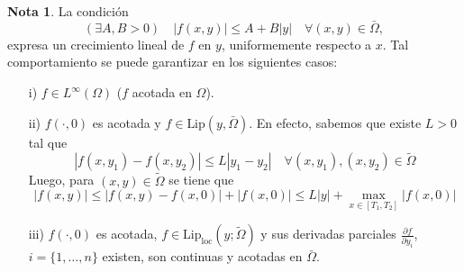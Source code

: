 \documentclass[11pt]{article}
\theoremstyle{definition} %
\newtheorem{note}[theorem]{Nota}
\begin{document}
\begin{note}
  La condición
  \[ (\exists A, B > 0) \quad |f(x,y)| \leq A + B|y| \quad \forall (x,y) \in \bar{\Omega}, \]
  expresa un crecimiento lineal de $f$ en $y$, uniformemente respecto a $x$. Tal comportamiento se puede garantizar en los siguientes casos:
  \begin{enumerate}
      \item[i)] $f \in L^\infty(\Omega)$ ($f$ acotada en $\Omega$).
      \item[ii)] $f(\cdot,0)$ es acotada y $f \in \text{Lip}(y, \bar{\Omega})$. En efecto, sabemos que existe $L > 0$ tal que
      \[ |f(x,y_1) - f(x,y_2)| \leq L|y_1 - y_2| \quad \forall (x,y_1), (x,y_2) \in \tilde{\Omega} \]
      Luego, para $(x,y) \in \tilde{\Omega}$ se tiene que
      \[ |f(x,y)| \leq |f(x,y) - f(x,0)| + |f(x,0)| \leq L|y| + \max_{x \in [T_1, T_2]} |f(x,0)| \]
      \item[iii)] $f(\cdot, 0)$ es acotada, $f \in \text{Lip}_{\text{loc}}(y;\tilde{\Omega})$ y sus derivadas parciales $\frac{\partial f}{\partial y_i}$, $i = \{1, \dots, n\}$ existen, son continuas y acotadas en $\bar{\Omega}$.
  \end{enumerate}
\end{note}
\end{document}

